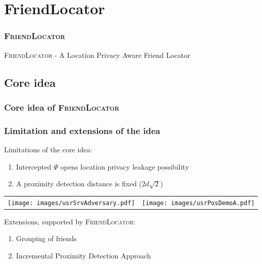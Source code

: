 \section{FriendLocator} %

\begin{frame}[red]
\frametitle{\textsc{FriendLocator}}
\begin{center}
\Large\textsc{FriendLocator} - A Location Privacy Aware Friend Locator
\end{center}
\end{frame}

\subsection{Core idea}
\begin{frame}[red]
\frametitle{Core idea of \textsc{FriendLocator}}
\end{frame}

\begin{frame}[red]
\frametitle{Limitation and extensions of the idea}
Limitations of the core idea:
\begin{enumerate}
 \item Intercepted $\Psi$ opens location privacy leakage possibility
 \item A proximity detection distance is fixed ($2d\sqrt{2}$)  
\end{enumerate}
	\begin{tabular}{p{5cm} p{4cm}} 
	   \texttt{[image: images/usrSrvAdversary.pdf]} &
	   \texttt{[image: images/usrPosDemoA.pdf]} 
	\end{tabular}
	
Extensions, supported by \textsc{FriendLocator}:
\begin{enumerate}
   \item Grouping of friends
   \item Incremental Proximity Detection Approach
\end{enumerate}
\end{frame}

